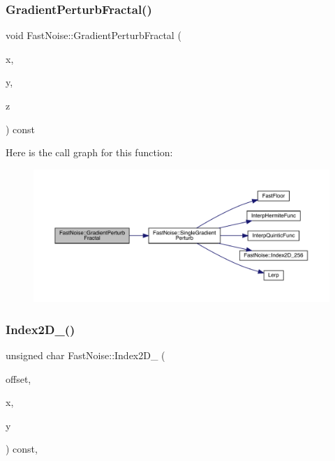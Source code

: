 \subsubsection{\texorpdfstring{Gradient\+Perturb\+Fractal()}{GradientPerturbFractal()}\hspace{0.1cm}{\footnotesize\ttfamily [2/2]}}
{\footnotesize\ttfamily void Fast\+Noise\+::\+Gradient\+Perturb\+Fractal (\begin{DoxyParamCaption}\item[{\mbox{\hyperlink{_fast_noise_8h_a75a9ef6d2541c4921815b885bfd449c3}{F\+N\+\_\+\+D\+E\+C\+I\+M\+AL}} \&}]{x,  }\item[{\mbox{\hyperlink{_fast_noise_8h_a75a9ef6d2541c4921815b885bfd449c3}{F\+N\+\_\+\+D\+E\+C\+I\+M\+AL}} \&}]{y,  }\item[{\mbox{\hyperlink{_fast_noise_8h_a75a9ef6d2541c4921815b885bfd449c3}{F\+N\+\_\+\+D\+E\+C\+I\+M\+AL}} \&}]{z }\end{DoxyParamCaption}) const}

Here is the call graph for this function\+:
\nopagebreak
\begin{figure}[H]
\begin{center}
\leavevmode
\includegraphics[width=350pt]{d1/dd8/class_fast_noise_a155a219f6356b75e3dfc2610d03e801a_cgraph}
\end{center}
\end{figure}
\mbox{\label{class_fast_noise_aa4cae648a6a3817d77dcd7439f711827}} 
\subsubsection{\texorpdfstring{Index2\+D\+\_()}{Index2D\_12()}}
{\footnotesize\ttfamily unsigned char Fast\+Noise\+::\+Index2\+D\+\_ (\begin{DoxyParamCaption}\item[{unsigned char}]{offset,  }\item[{int}]{x,  }\item[{int}]{y }\end{DoxyParamCaption}) const\hspace{0.3cm}{\ttfamily [inline]}, {\ttfamily [private]}}

